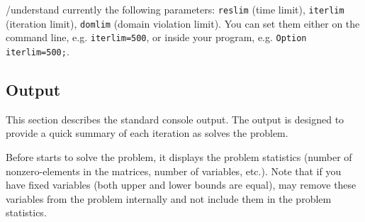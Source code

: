 
\GAMS/\IPOPT understand currently the following \GAMS parameters: \texttt{reslim} (time limit), \texttt{iterlim} (iteration limit), \texttt{domlim} (domain violation limit).
You can set them either on the command line, e.g. \verb+iterlim=500+, or inside your \GAMS program, e.g. \verb+Option iterlim=500;+.


\subsection{Output}

This section describes the standard \IPOPT console output.
The output is designed to provide a quick summary of each iteration as \IPOPT solves the problem.

Before \IPOPT starts to solve the problem, it displays the problem statistics (number of nonzero-elements in the matrices, number of variables, etc.).
Note that if you have fixed variables (both upper and lower bounds are equal), \IPOPT may remove these variables from the problem internally and not include them in the problem statistics.

